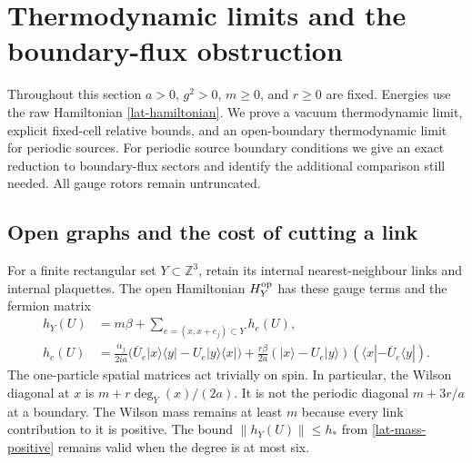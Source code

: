 \section{Thermodynamic limits and the boundary-flux obstruction}
\label{therm4-section}

Throughout this section $a>0$, $g^2>0$, $m\ge0$, and $r\ge0$ are
fixed.  Energies use the raw Hamiltonian \eqref{lat-hamiltonian}.
We prove a vacuum thermodynamic limit, explicit fixed-cell relative
bounds, and an open-boundary thermodynamic limit for periodic sources.
For periodic source boundary conditions we give an exact reduction to
boundary-flux sectors and identify the additional comparison still
needed.  All gauge rotors remain untruncated.

\subsection{Open graphs and the cost of cutting a link}

For a finite rectangular set $Y\subset\mathbb Z^3$, retain its internal
nearest-neighbour links and internal plaquettes.  The open Hamiltonian
$H_Y^{\rm op}$ has these gauge terms and the fermion matrix
\begin{align}
 h_Y(U)&=m\beta+\sum_{e=(x,x+e_j)\subset Y}h_e(U),\nonumber\\
 h_e(U)&=\frac{\alpha_j}{2ia}
 \bigl(\overline U_e|x\rangle\langle y|-U_e|y\rangle\langle x|\bigr)
 +\frac{r\beta}{2a}
 (|x\rangle-U_e|y\rangle)(\langle x|-\overline U_e\langle y|).
 \label{therm4-open-matrix}
\end{align}
The one-particle spatial matrices act trivially on spin.  In particular,
the Wilson diagonal at $x$ is $m+r\deg_Y(x)/(2a)$.
It is not the periodic diagonal $m+3r/a$ at a boundary.
The Wilson mass remains at least $m$ because every link contribution
to it is positive.  The bound $\|h_Y(U)\|\le h_*$ from
\eqref{lat-mass-positive} remains valid when the degree is at most six.

